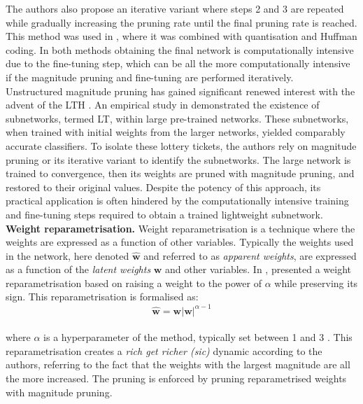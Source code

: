 The authors also propose an iterative variant where steps 2 and 3 are
repeated while gradually increasing the pruning rate until the final pruning
rate is reached. This method was used in \cite{DBLP:journals/corr/HanMD15},
where it was combined with quantisation and Huffman coding. In both methods
\cite{DBLP:conf/nips/HanPTD15,DBLP:journals/corr/HanMD15} obtaining the final
network is computationally intensive due to the fine-tuning step, which can be
all the more computationally intensive if the magnitude pruning and fine-tuning
are performed iteratively. \\


Unstructured magnitude pruning has gained significant renewed interest with the
advent of the \acf{LTH} \cite{DBLP:conf/iclr/FrankleC19}. An empirical study in
\cite{DBLP:conf/iclr/FrankleC19} demonstrated the existence of subnetworks,
termed \acf{LT}, within large pre-trained networks. These subnetworks, when
trained with initial weights from the larger networks, yielded comparably
accurate classifiers. To isolate these lottery tickets, the authors rely on
magnitude pruning or its iterative variant to identify the subnetworks. The
large network is trained to convergence, then its weights are pruned with
magnitude pruning, and restored to their original values. Despite the potency of
this approach, its practical application is often hindered by the
computationally intensive training and fine-tuning steps required to obtain a
trained lightweight subnetwork.\\


\noindent \textbf{Weight reparametrisation.} Weight reparametrisation is a
technique where the weights are expressed as a function of other variables.
Typically the weights used in the network, here denoted $\mathbf{\hat{w}}$ and
referred to as \emph{apparent weights}, are expressed as a function of the
\emph{latent weights} $\mathbf{w}$ and other variables. In \cite{powerprop},
\citeauthor{powerprop} presented a weight reparametrisation based on raising a
weight to the power of $\alpha$ while preserving its sign. This
reparametrisation is formalised as: \\

\begin{equation}
  \label{eqn:chap1:power_propagation}
  \mathbf{\hat{w}} = \mathbf{w} |\mathbf{w}|^{\alpha-1}
\end{equation}\\

\noindent where $\alpha$ is a hyperparameter of the method, typically set
between 1 and 3 \cite{powerprop}. This reparametrisation
creates a \emph{rich get richer (sic)} dynamic according to the authors,
referring to the fact that the weights with the largest magnitude are all the
more increased. The pruning is enforced by pruning reparametrised weights with
magnitude pruning.\\



